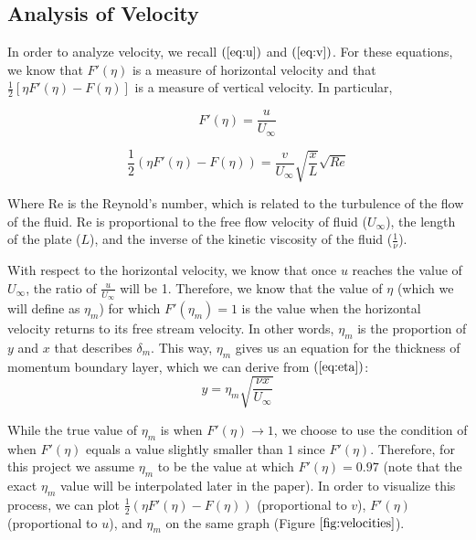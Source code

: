 \documentclass[12pt]{article}\pagestyle{myheadings}
\theoremstyle{plain}
\begin{document}
\pagebreak

\subsection{Analysis of Velocity}
In order to analyze velocity, we recall $(\ref{eq:u})$ and $(\ref{eq:v})$. For these equations, we know that $F'(\eta)$ is a measure of horizontal velocity and that $\frac{1}{2}[\eta F'(\eta) - F(\eta)]$ is a measure of vertical velocity. In particular,

\begin{equation*}
F'(\eta) = \frac{u}{U_{\infty}}
\end{equation*}

\begin{equation*}
\frac{1}{2}(\eta F'(\eta) - F(\eta)) = \frac{v}{U_{\infty}} \sqrt{\frac{x}{L}} \sqrt{Re}
\end{equation*}

Where Re is the Reynold's number, which is related to the turbulence of the flow of the fluid. Re is proportional to the free flow velocity of fluid ($U_{\infty}$), the length of the plate ($L$), and the inverse of the kinetic viscosity of the fluid ($\frac{1}{\nu}$).

With respect to the horizontal velocity, we know that once $u$ reaches the value of $U_{\infty}$, the ratio of $\frac{u}{U_{\infty}}$ will be 1. Therefore, we know that the value of $\eta$ (which we will define as $\eta_{m}$) for which $F'(\eta_{m}) = 1$ is the value when the horizontal velocity returns to its free stream velocity. In other words, $\eta_{m}$ is the proportion of $y$ and $x$ that describes $\delta_{m}$. This way, $\eta_{m}$ gives us an equation for the thickness of momentum boundary layer, which we can derive from $(\ref{eq:eta})$:\\
\begin{equation}\label{eq:momentumBoundary}
y = \eta_{m} \sqrt{\frac{\nu x}{U_{\infty}}}
\end{equation}

While the true value of $\eta_{m}$ is when $F'(\eta) \rightarrow 1$, we choose to use the condition of when $F'(\eta)$ equals a value slightly smaller than $1$ since $F'(\eta)$. Therefore, for this project we assume $\eta_{m}$ to be the value at which $F'(\eta) = 0.97$ (note that the exact $\eta_{m}$ value will be interpolated later in the paper). In order to visualize this process, we can plot $\frac{1}{2}(\eta F'(\eta) - F(\eta))$ (proportional to $v$), $F'(\eta)$ (proportional to $u$), and $\eta_{m}$ on the same graph (Figure $\ref{fig:velocities}$).
\end{document}
